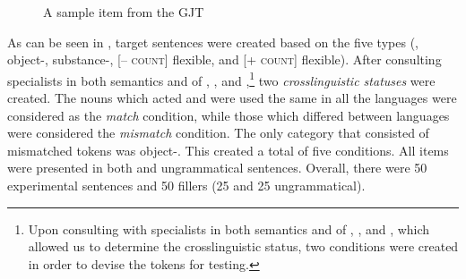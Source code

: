 \documentclass[output=paper]{langsci/langscibook}
\begin{document}
\begin{figure}[t]
\caption{\label{fig:thomas:1} A sample item from the GJT}
\end{figure}

 
As can be seen in ,  target sentences were created based on the five  types (, object-, substance-, [\textsc{– count}] flexible, and [\textsc{+ count}] flexible). After consulting  specialists in both semantics and  of , , and ,\footnote{Upon consulting with specialists in both semantics and  of , , and , which allowed us to determine the crosslinguistic status, two conditions were created in order to devise the tokens for testing.} two \textit{crosslinguistic statuses} were created. The nouns which acted and were used the same in all the languages were considered as the \textit{match} condition, while those which differed between languages were considered the \textit{mismatch} condition. The only category that consisted of mismatched tokens was object-. This created a total of five conditions. All items were presented in both  and ungrammatical sentences. Overall, there were 50 experimental sentences and 50 fillers (25  and 25 ungrammatical).
\end{document}

